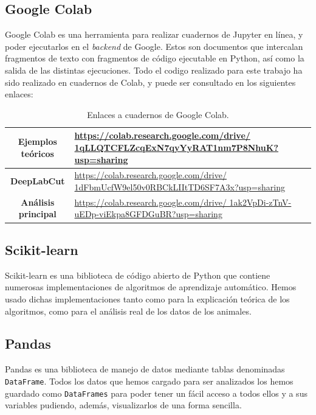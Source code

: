 \subsection*{Google Colab}
Google Colab es una herramienta para realizar cuadernos de Jupyter en línea, y poder ejecutarlos en el \textit{backend} de Google. Estos son documentos que intercalan fragmentos de texto con fragmentos de código ejecutable en Python, así como la salida de las distintas ejecuciones. Todo el codigo realizado para este trabajo ha sido realizado en cuadernos de Colab, y puede ser consultado en los siguientes enlaces:

\begin{table}[h]
    \centering
    \begin{tabular}{|c|p{10cm}|}
        \hline
        \textbf{Ejemplos teóricos} & \href{https://colab.research.google.com/drive/
        1qLLQTCFLZcqExN7qyYyRAT1nm7P8NhuK?usp=sharing}{https://colab.research.google.com/drive/ 1qLLQTCFLZcqExN7qyYyRAT1nm7P8NhuK?usp=sharing} \\
        \hline
        \textbf{DeepLabCut} & \href{https://colab.research.google.com/drive/1dFbmUcfW9el50v0RBCkLIItTD6SF7A3x?usp=sharing}{https://colab.research.google.com/drive/
        1dFbmUcfW9el50v0RBCkLIItTD6SF7A3x?usp=sharing} \\
        \hline
        \textbf{Análisis principal} & \href{https://colab.research.google.com/drive/
        1ak2VpDi-zTnV-uEDp-viEkpa8GFDGuBR?usp=sharing}{https://colab.research.google.com/drive/ 1ak2VpDi-zTnV-uEDp-viEkpa8GFDGuBR?usp=sharing} \\
        \hline
    \end{tabular}
    \caption{Enlaces a cuadernos de Google Colab.}
    \label{tab:colab-links}
\end{table}

\subsection*{Scikit-learn}
Scikit-learn \cite{scikit-learn} es una biblioteca de código abierto de Python que contiene numerosas implementaciones de algoritmos de aprendizaje automático. Hemos usado dichas implementaciones tanto como para la explicación teórica de los algoritmos, como para el análisis real de los datos de los animales.

\subsection*{Pandas}
Pandas es una biblioteca de manejo de datos mediante tablas denominadas \texttt{DataFrame}. Todos los datos que hemos cargado para ser analizados los hemos guardado como \texttt{DataFrames} para poder tener un fácil acceso a todos ellos y a sus variables pudiendo, además, visualizarlos de una forma sencilla.

